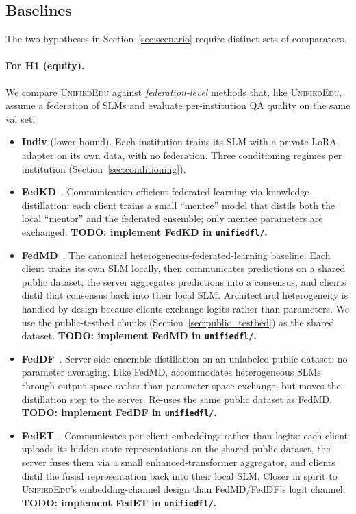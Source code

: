 \documentclass[11pt]{article}
\theoremstyle{plain}
\theoremstyle{definition}
\theoremstyle{remark}
\newcommand{\red}[1]{\textcolor{myred}{\textbf{#1}}}
\newcommand{\UniEdu}{\textsc{UnifiedEdu}}
\begin{document}
\subsection{Baselines}
\label{sec:baselines}

The two hypotheses in Section~\ref{sec:scenario} require
distinct sets of comparators.

\paragraph{For H1 (equity).}
We compare \UniEdu{} against \emph{federation-level}
methods that, like \UniEdu{}, assume a federation of
SLMs and evaluate per-institution QA quality on
the same val set:
\begin{itemize}[leftmargin=1.5em, itemsep=2pt]
  \item \textbf{Indiv} (lower bound). Each
  institution trains its SLM with a private LoRA
  adapter on its own data, with no federation. Three
  conditioning regimes per institution
  (Section~\ref{sec:conditioning}).
  \item \textbf{FedKD}~\citep{wu2022fedkd}.
  Communication-efficient federated learning via
  knowledge distillation: each client trains a small
  ``mentee'' model that distils both the local
  ``mentor'' and the federated ensemble; only mentee
  parameters are exchanged. \red{TODO: implement FedKD in \texttt{unifiedfl/}.}
  \item \textbf{FedMD}~\citep{li2019fedmd}. The
  canonical heterogeneous-federated-learning
  baseline. Each client trains its own SLM locally,
  then communicates predictions on a shared
  public dataset; the server aggregates predictions
  into a consensus, and clients distil that consensus
  back into their local SLM. Architectural
  heterogeneity is handled by-design because clients
  exchange logits rather than parameters. We use the
  public-testbed chunks (Section~\ref{sec:public_testbed})
  as the shared dataset. \red{TODO: implement FedMD in \texttt{unifiedfl/}.}
  \item \textbf{FedDF}~\citep{lin2020feddf}.
  Server-side ensemble distillation on an unlabeled
  public dataset; no parameter averaging. Like
  FedMD, accommodates heterogeneous SLMs through
  output-space rather than parameter-space exchange,
  but moves the distillation step to the server.
  Re-uses the same public dataset as FedMD.
  \red{TODO: implement FedDF in \texttt{unifiedfl/}.}
  \item \textbf{FedET}~\citep{cheng2022fedet}.
  Communicates per-client embeddings rather than
  logits: each client uploads its hidden-state
  representations on the shared public dataset, the
  server fuses them via a small enhanced-transformer
  aggregator, and clients distil the fused
  representation back into their local SLM. Closer
  in spirit to \UniEdu{}'s embedding-channel design
  than FedMD/FedDF's logit channel. \red{TODO: implement FedET in \texttt{unifiedfl/}.}


\end{itemize}
\end{document}
